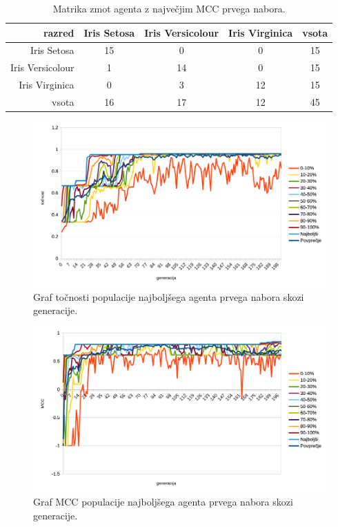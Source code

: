 \begin{table}[H]
    \centering
    \begin{tabular}{||rcccc||}
        \hline
        razred           & Iris Setosa & Iris Versicolour & Iris Virginica & vsota \\ \hline
        Iris Setosa      & 15          & 0                & 0              & 15    \\ \hline
        Iris Versicolour & 1           & 14               & 0              & 15    \\ \hline
        Iris Virginica   & 0           & 3                & 12             & 15    \\ \hline
        vsota            & 16          & 17               & 12             & 45    \\ \hline
    \end{tabular}
    \caption{Matrika zmot agenta z največjim MCC prvega nabora.}
    \label{tab:iris_mcc_1}
\end{table}

\begin{figure}[H]
    \begin{center}
        \includegraphics[width=13cm]{iris/1/acc}
    \end{center}
    \caption{Graf točnosti populacije najboljšega agenta prvega nabora skozi generacije.}
    \label{fig:iris_acc_1}
\end{figure}

\begin{figure}[H]
    \begin{center}
        \includegraphics[width=13cm]{iris/1/mcc}
    \end{center}
    \caption{Graf MCC populacije najboljšega agenta prvega nabora skozi generacije.}
    \label{fig:iris_mcc_1}
\end{figure}

